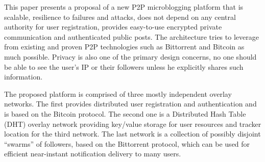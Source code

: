 \documentclass{article}
\begin{document}
This paper presents a proposal of a new P2P microblogging platform that is scalable, resilience to failures and attacks, does not depend on any central authority for user registration, provides easy-to-use encrypted private communication and authenticated public posts. The architecture tries to leverage from existing and proven P2P technologies such as Bittorrent and Bitcoin as much possible. Privacy is also one of the primary design concerns, no one should be able to see the user's IP or their followers unless he explicitly shares such information.

The proposed platform is comprised of three mostly independent overlay networks. The first provides distributed user registration and authentication and is based on the Bitcoin protocol. The second one is a Distributed Hash Table (DHT) overlay network providing key/value storage for user resources and tracker location for the third network. The last network is a collection of possibly disjoint ``swarms'' of followers, based on the Bittorrent protocol, which can be used for efficient near-instant notification delivery to many users.
\end{document}
